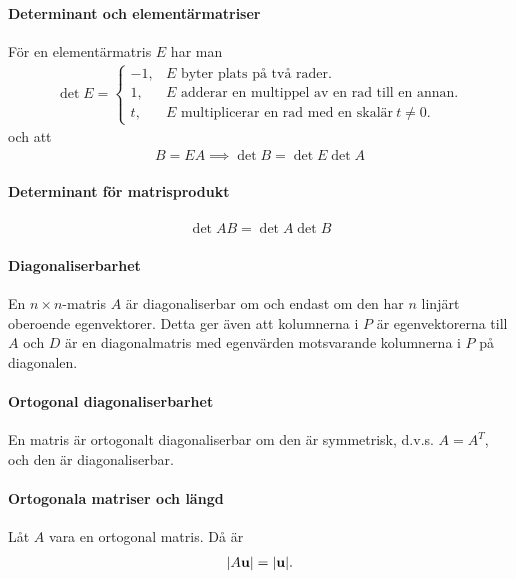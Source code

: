 \paragraph{Determinant och elementärmatriser}
För en elementärmatris $E$ har man
\begin{align*}
	\det{E} =
	\begin{cases}
		-1, &E\text{ byter plats på två rader.} \\
		1,  &E\text{ adderar en multippel av en rad till en annan.} \\
		t,  &E\text{ multiplicerar en rad med en skalär}~t\neq 0.
	\end{cases}
\end{align*}
och att
\begin{align*}
	B = EA \implies \det{B} = \det{E}\det{A}
\end{align*}

\proof

\paragraph{Determinant för matrisprodukt}
\begin{align*}
	\det{AB} = \det{A}\det{B}
\end{align*}

\proof

\paragraph{Diagonaliserbarhet}
En $n\times n$-matris $A$ är diagonaliserbar om och endast om den har $n$ linjärt oberoende egenvektorer. Detta ger även att kolumnerna i $P$ är egenvektorerna till $A$ och $D$ är en diagonalmatris med egenvärden motsvarande kolumnerna i $P$ på diagonalen.

\proof

\paragraph{Ortogonal diagonaliserbarhet}
En matris är ortogonalt diagonaliserbar om den är symmetrisk, d.v.s. $A = A^T$, och den är diagonaliserbar.

\proof

\paragraph{Ortogonala matriser och längd}
Låt $A$ vara en ortogonal matris. Då är
\begin{align*}
	\abs{A\vect{u}} = \abs{\vect{u}}.
\end{align*}

